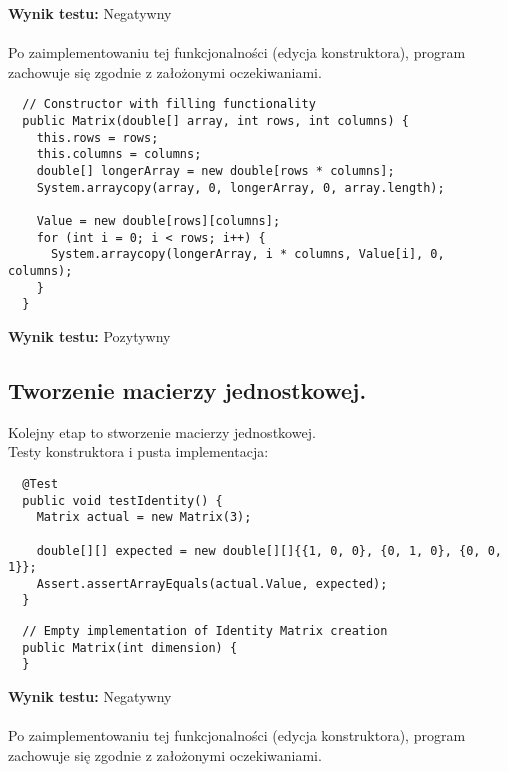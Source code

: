 \documentclass[a4paper,12pt,twoside]{article}
\begin{document}
\noindent
\textbf{Wynik testu: }{\color{red} Negatywny}\\\\
Po zaimplementowaniu tej funkcjonalności (edycja konstruktora), program
zachowuje się zgodnie z założonymi oczekiwaniami.\\

\begin{lstlisting}
  // Constructor with filling functionality
  public Matrix(double[] array, int rows, int columns) {
    this.rows = rows;
    this.columns = columns;
    double[] longerArray = new double[rows * columns];
    System.arraycopy(array, 0, longerArray, 0, array.length);

    Value = new double[rows][columns];
    for (int i = 0; i < rows; i++) {
      System.arraycopy(longerArray, i * columns, Value[i], 0, columns);
    }
  }
\end{lstlisting}
\medskip

\noindent
\textbf{Wynik testu: }{\color{green} Pozytywny}


\subsection{Tworzenie macierzy jednostkowej.}
\bigskip

Kolejny etap to stworzenie macierzy jednostkowej.\\

\noindent
Testy konstruktora i pusta implementacja:\\

\begin{lstlisting}
  @Test
  public void testIdentity() {
    Matrix actual = new Matrix(3);

    double[][] expected = new double[][]{{1, 0, 0}, {0, 1, 0}, {0, 0, 1}};
    Assert.assertArrayEquals(actual.Value, expected);
  }
\end{lstlisting}

\begin{lstlisting}
  // Empty implementation of Identity Matrix creation
  public Matrix(int dimension) {
  }
\end{lstlisting}
\medskip

\noindent
\textbf{Wynik testu: }{\color{red} Negatywny}\\\\
Po zaimplementowaniu tej funkcjonalności (edycja konstruktora), program
zachowuje się zgodnie z założonymi oczekiwaniami.\\
\end{document}
